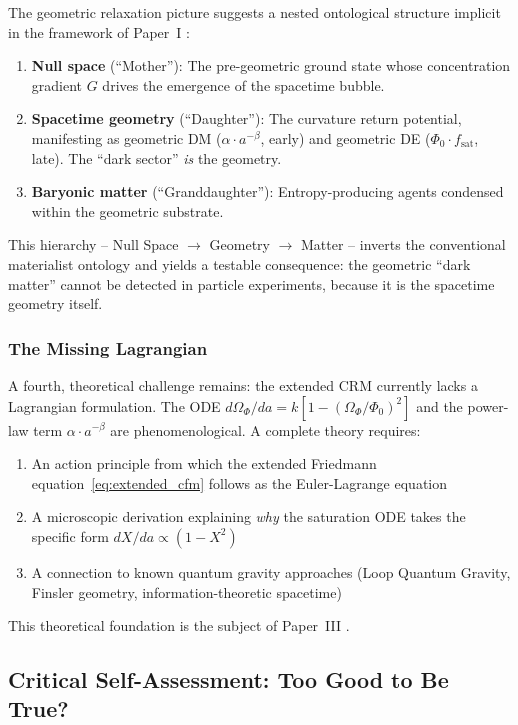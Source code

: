 \documentclass[aps,prd,twocolumn,superscriptaddress,nofootinbib]{revtex4-2}
\begin{document}
The geometric relaxation picture suggests a nested ontological structure implicit in the framework of Paper~I \cite{Geiger2026}:

\begin{enumerate}
\item \textbf{Null space} (``Mother''): The pre-geometric ground state whose concentration gradient $G$ drives the emergence of the spacetime bubble.
\item \textbf{Spacetime geometry} (``Daughter''): The curvature return potential, manifesting as geometric DM ($\alpha \cdot a^{-\beta}$, early) and geometric DE ($\Phi_0 \cdot f_{\mathrm{sat}}$, late). The ``dark sector'' \textit{is} the geometry.
\item \textbf{Baryonic matter} (``Granddaughter''): Entropy-producing agents condensed within the geometric substrate.
\end{enumerate}

This hierarchy -- Null Space $\to$ Geometry $\to$ Matter -- inverts the conventional materialist ontology and yields a testable consequence: the geometric ``dark matter'' cannot be detected in particle experiments, because it is the spacetime geometry itself.

\subsubsection{The Missing Lagrangian}

A fourth, theoretical challenge remains: the extended CRM currently lacks a Lagrangian formulation. The ODE $d\Omega_\Phi/da = k[1 - (\Omega_\Phi/\Phi_0)^2]$ and the power-law term $\alpha \cdot a^{-\beta}$ are phenomenological. A complete theory requires:
\begin{enumerate}
\item An action principle from which the extended Friedmann equation~\eqref{eq:extended_cfm} follows as the Euler-Lagrange equation
\item A microscopic derivation explaining \textit{why} the saturation ODE takes the specific form $dX/da \propto (1 - X^2)$
\item A connection to known quantum gravity approaches (Loop Quantum Gravity, Finsler geometry, information-theoretic spacetime)
\end{enumerate}

This theoretical foundation is the subject of Paper~III \cite{Geiger2026c}.


\subsection{Critical Self-Assessment: Too Good to Be True?}
\end{document}
